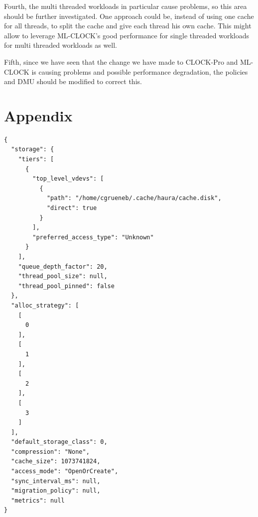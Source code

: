 \documentclass[
	12pt,
	a4paper,
	abstract,
	bibliography=totoc,
	chapterprefix,
	headings=openright,
	numbers=endperiod,
	parskip=half,
	twoside,
]{scrreprt}
\begin{document}
Fourth, the multi threaded workloads in particular cause problems, so this area should be further investigated.
One approach could be, instead of using one cache for all threads, to split the cache and give each thread his own cache.
This might allow to leverage ML-CLOCK's good performance for single threaded workloads for multi threaded workloads as well.

Fifth, since we have seen that the change we have made to CLOCK-Pro and ML-CLOCK 
is causing problems and possible performance degradation, the policies and DMU should be 
modified to correct this.








\appendix

\chapter{Appendix}
\label{cha:appendix}


\begin{lstlisting}[mathescape=true,caption={Haura configuration file used for benchmark runs.},label=lst:configuration haura]
{
  "storage": {
    "tiers": [
      {
        "top_level_vdevs": [
          {
            "path": "/home/cgrueneb/.cache/haura/cache.disk",
            "direct": true
          }
        ],
        "preferred_access_type": "Unknown"
      }
    ],
    "queue_depth_factor": 20,
    "thread_pool_size": null,
    "thread_pool_pinned": false
  },
  "alloc_strategy": [
    [
      0
    ],
    [
      1
    ],
    [
      2
    ],
    [
      3
    ]
  ],
  "default_storage_class": 0,
  "compression": "None",
  "cache_size": 1073741824,
  "access_mode": "OpenOrCreate",
  "sync_interval_ms": null,
  "migration_policy": null,
  "metrics": null
}

\end{lstlisting}




\chapter*{}
\end{document}
